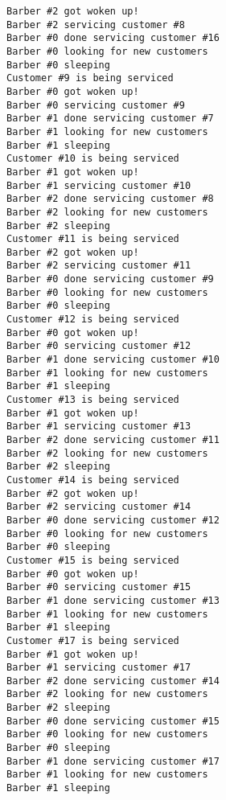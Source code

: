 \documentclass [10pt,a4paper]{article}
\begin{document}
\begin{verbatim}
Barber #2 got woken up!
Barber #2 servicing customer #8
Barber #0 done servicing customer #16
Barber #0 looking for new customers
Barber #0 sleeping
Customer #9 is being serviced
Barber #0 got woken up!
Barber #0 servicing customer #9
Barber #1 done servicing customer #7
Barber #1 looking for new customers
Barber #1 sleeping
Customer #10 is being serviced
Barber #1 got woken up!
Barber #1 servicing customer #10
Barber #2 done servicing customer #8
Barber #2 looking for new customers
Barber #2 sleeping
Customer #11 is being serviced
Barber #2 got woken up!
Barber #2 servicing customer #11
Barber #0 done servicing customer #9
Barber #0 looking for new customers
Barber #0 sleeping
Customer #12 is being serviced
Barber #0 got woken up!
Barber #0 servicing customer #12
Barber #1 done servicing customer #10
Barber #1 looking for new customers
Barber #1 sleeping
Customer #13 is being serviced
Barber #1 got woken up!
Barber #1 servicing customer #13
Barber #2 done servicing customer #11
Barber #2 looking for new customers
Barber #2 sleeping
Customer #14 is being serviced
Barber #2 got woken up!
Barber #2 servicing customer #14
Barber #0 done servicing customer #12
Barber #0 looking for new customers
Barber #0 sleeping
Customer #15 is being serviced
Barber #0 got woken up!
Barber #0 servicing customer #15
Barber #1 done servicing customer #13
Barber #1 looking for new customers
Barber #1 sleeping
Customer #17 is being serviced
Barber #1 got woken up!
Barber #1 servicing customer #17
Barber #2 done servicing customer #14
Barber #2 looking for new customers
Barber #2 sleeping
Barber #0 done servicing customer #15
Barber #0 looking for new customers
Barber #0 sleeping
Barber #1 done servicing customer #17
Barber #1 looking for new customers
Barber #1 sleeping
\end{verbatim}

\end{document}
